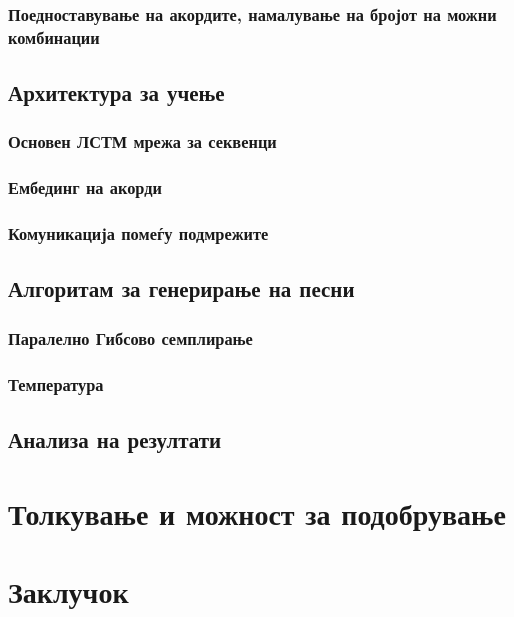 \subsection{Поедноставување на акордите, намалување на бројот на можни комбинации}

\section{Архитектура за учење}

\subsection{Основен ЛСТМ мрежа за секвенци}

\subsection{Ембединг на акорди}

\subsection{Комуникација помеѓу подмрежите}

\section{Алгоритам за генерирање на песни}

\subsection{Паралелно Гибсово семплирање}

\subsection{Температура} 

\section{Анализа на резултати}

\chapter{Толкување и можност за подобрување}

\chapter{Заклучок}